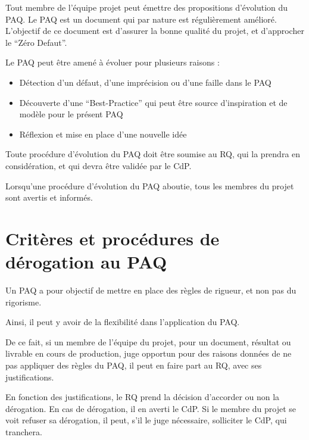 Tout membre de l'équipe projet peut émettre des propositions d'évolution du PAQ. Le PAQ est un document qui par nature est régulièrement amélioré. L'objectif de ce document est d'assurer la bonne qualité du projet, et d'approcher le ``Zéro Defaut''.

Le PAQ peut être amené à évoluer pour plusieurs raisons :

\begin{itemize}
\item Détection d'un défaut, d'une imprécision ou d'une faille dans le PAQ
\item Découverte d'une ``Best-Practice'' qui peut être source d'inspiration et de modèle pour le présent PAQ
\item Réflexion et mise en place d'une nouvelle idée
\end{itemize}

Toute procédure d'évolution du PAQ doit être soumise au RQ, qui la prendra en considération, et qui devra être validée par le CdP.

Lorsqu'une procédure d'évolution du PAQ aboutie, tous les membres du projet sont avertis et informés.

\section{Critères et procédures de dérogation au PAQ}

Un PAQ a pour objectif de mettre en place des règles de rigueur, et non pas du rigorisme.

Ainsi, il peut y avoir de la flexibilité dans l'application du PAQ.

De ce fait, si un membre de l'équipe du projet, pour un document, résultat ou livrable en cours de production, juge opportun pour des raisons données de ne pas appliquer des règles du PAQ, il peut en faire part au RQ, avec ses justifications.

En fonction des justifications, le RQ prend la décision d'accorder ou non la dérogation. En cas de dérogation, il en averti le CdP. Si le membre du projet se voit refuser sa dérogation, il peut, s'il le juge nécessaire, solliciter le CdP, qui tranchera.

%
%

